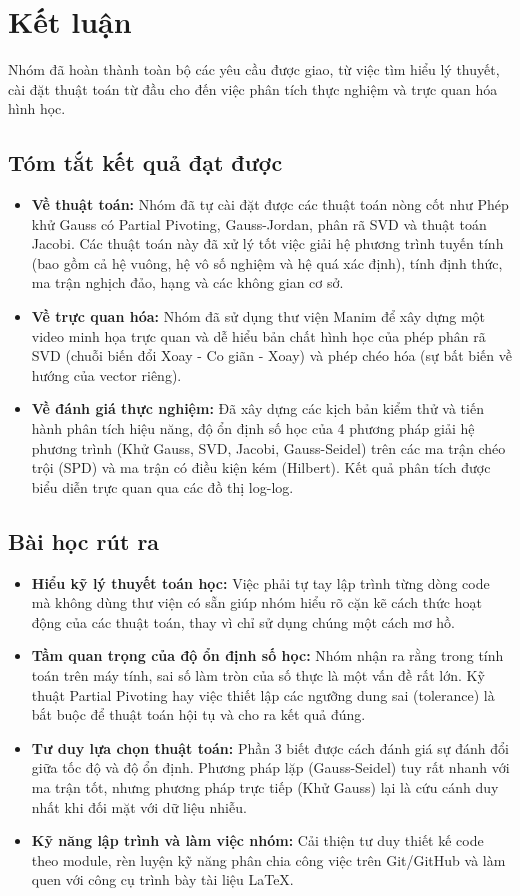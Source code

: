 \section{Kết luận}

Nhóm đã hoàn thành toàn bộ các yêu cầu được giao, từ việc tìm hiểu lý thuyết, cài đặt thuật toán từ đầu cho đến việc phân tích thực nghiệm và trực quan hóa hình học.

\subsection{Tóm tắt kết quả đạt được}
\begin{itemize}
    \item \textbf{Về thuật toán:} Nhóm đã tự cài đặt được các thuật toán nòng cốt như Phép khử Gauss có Partial Pivoting, Gauss-Jordan, phân rã SVD và thuật toán Jacobi. Các thuật toán này đã xử lý tốt việc giải hệ phương trình tuyến tính (bao gồm cả hệ vuông, hệ vô số nghiệm và hệ quá xác định), tính định thức, ma trận nghịch đảo, hạng và các không gian cơ sở.
    \item \textbf{Về trực quan hóa:} Nhóm đã sử dụng thư viện Manim để xây dựng một video minh họa trực quan và dễ hiểu bản chất hình học của phép phân rã SVD (chuỗi biến đổi Xoay - Co giãn - Xoay) và phép chéo hóa (sự bất biến về hướng của vector riêng).
    \item \textbf{Về đánh giá thực nghiệm:} Đã xây dựng các kịch bản kiểm thử và tiến hành phân tích hiệu năng, độ ổn định số học của 4 phương pháp giải hệ phương trình (Khử Gauss, SVD, Jacobi, Gauss-Seidel) trên các ma trận chéo trội (SPD) và ma trận có điều kiện kém (Hilbert). Kết quả phân tích được biểu diễn trực quan qua các đồ thị log-log.
\end{itemize}

\subsection{Bài học rút ra}
\begin{itemize}
    \item \textbf{Hiểu kỹ lý thuyết toán học:} Việc phải tự tay lập trình từng dòng code mà không dùng thư viện có sẵn giúp nhóm hiểu rõ cặn kẽ cách thức hoạt động của các thuật toán, thay vì chỉ sử dụng chúng một cách mơ hồ.
    \item \textbf{Tầm quan trọng của độ ổn định số học:} Nhóm nhận ra rằng trong tính toán trên máy tính, sai số làm tròn của số thực là một vấn đề rất lớn. Kỹ thuật Partial Pivoting hay việc thiết lập các ngưỡng dung sai (tolerance) là bắt buộc để thuật toán hội tụ và cho ra kết quả đúng.
    \item \textbf{Tư duy lựa chọn thuật toán:} Phần 3 biết được cách đánh giá sự đánh đổi giữa tốc độ và độ ổn định. Phương pháp lặp (Gauss-Seidel) tuy rất nhanh với ma trận tốt, nhưng phương pháp trực tiếp (Khử Gauss) lại là cứu cánh duy nhất khi đối mặt với dữ liệu nhiễu.
    \item \textbf{Kỹ năng lập trình và làm việc nhóm:} Cải thiện tư duy thiết kế code theo module, rèn luyện kỹ năng phân chia công việc trên Git/GitHub và làm quen với công cụ trình bày tài liệu LaTeX.
\end{itemize}

